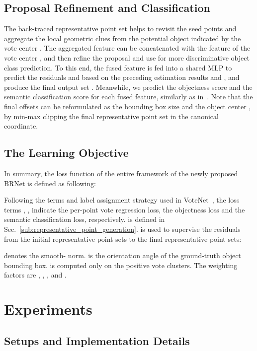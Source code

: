 \documentclass[final]{cvpr}
\newcommand{\method}{\textcolor{black}{BRNet }}
\begin{document}
\subsection{Proposal Refinement and Classification}

The back-traced representative point set  helps to revisit the seed points and aggregate the local geometric clues from the potential object indicated by the vote center .
The aggregated feature  can be concatenated with the feature  of the vote center , and then refine the proposal and use for more discriminative object class prediction.
To this end, the fused feature  is fed into a shared MLP to predict the residuals  and  based on the preceding estimation results  and , and produce the final 
output set .
Meanwhile, we predict the objectness score and the semantic classification score for each fused feature, similarly as in~\cite{votenet}.
Note that the final offsets  can be reformulated as the bounding box size  and the object center , by min-max clipping the final representative point set  in the canonical coordinate.



\subsection{The Learning Objective}
\label{subsec:learning-objective}

In summary, the loss function of the entire framework of the newly proposed \method is defined as following:

Following the terms and label assignment strategy used in VoteNet~\cite{votenet}, the loss terms , ,  indicate the per-point vote regression loss, the objectness loss and the semantic classification loss, respectively.  is defined in Sec.~\ref{sub:representative_point_generation}.
 is used to supervise the residuals from the initial representative point sets to the final representative point sets:

 denotes the smooth- norm.  is the orientation angle of the ground-truth object bounding box.  is computed only on the positive vote clusters.
The weighting factors are , , ,  and .


\section{Experiments}
\label{sec:experiments}


\subsection{Setups and Implementation Details}
\label{subsec:exp-setup}
\end{document}

